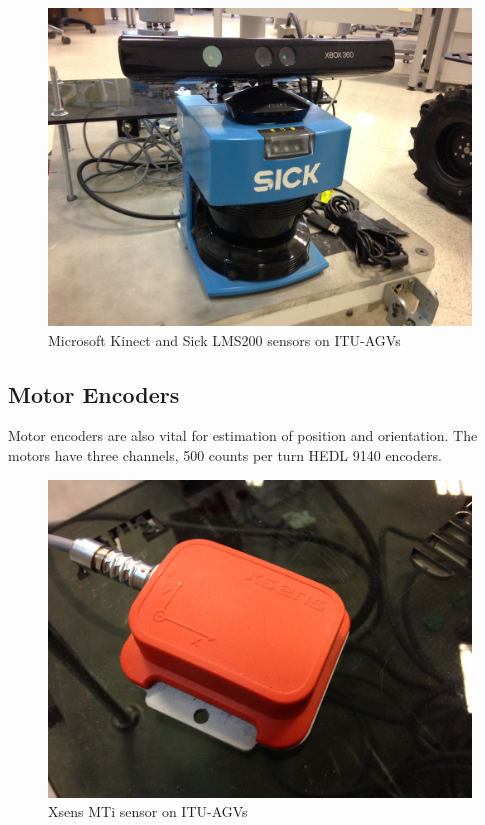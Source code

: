 \begin{figure}[h]
	\centering
	\includegraphics[scale=0.1]{images/kinect-sick}
	\caption{Microsoft Kinect and Sick LMS200 sensors on ITU-AGVs}
	\label{fig:kinect-sick}
\end{figure}

\subsection{Motor Encoders}
\label{subsec:encoder}
Motor encoders are also vital for estimation of position and orientation. The motors have three channels, 500 counts per turn HEDL 9140 encoders.

\begin{figure}
	\centering
	\includegraphics[scale=0.1]{images/xsens}
	\caption{Xsens MTi sensor on ITU-AGVs}
	\label{fig:xsens}
\end{figure}



